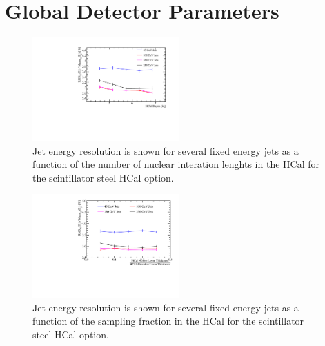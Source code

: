 
\section{Global Detector Parameters}


\iffalse
\label{optstud:sec:hcal:nlayers}


\begin{figure}
  \includegraphics[width=0.5\textwidth]{OptimisationStudies/Plots/JetEnergyResolutions/JER_vs_NumberOfNuclearInterationLengthsInTheHCal.pdf}
  \caption[Jet energy resolution as a function of the number of nuclear interaction lengths in the HCal for the scintillator steel HCal option.]{Jet energy resolution is shown for several fixed energy jets as a function of the number of nuclear interation lenghts in the HCal for the scintillator steel HCal option.}
  \label{optstud:fig:hcaldepth}
\end{figure}

\begin{figure}
  \includegraphics[width=0.5\textwidth]{OptimisationStudies/Plots/JetEnergyResolutions/JER_vs_SamplingFractionInTheHCal.pdf}
  \caption[Jet energy resolution as a function of the sampling fraction in the HCal for the scintillator steel HCal option.]{Jet energy resolution is shown for several fixed energy jets as a function of the sampling fraction in the HCal for the scintillator steel HCal option.}
  \label{optstud:fig:hcalsampfrac}
\end{figure}

